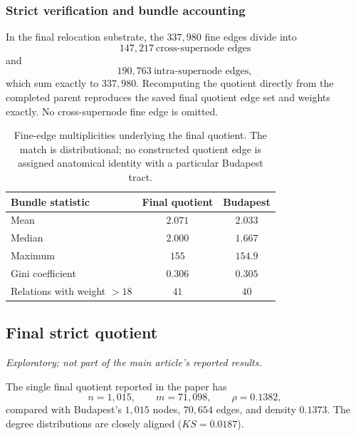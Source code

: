 \documentclass[12pt]{article}
\begin{document}
\subsubsection{Strict verification and bundle accounting}
In the final relocation substrate, the \(337{,}980\) fine edges divide into
\[
147{,}217\ \text{cross-supernode edges}
\]
and
\[
190{,}763\ \text{intra-supernode edges},
\]
which sum exactly to \(337{,}980\).  Recomputing the quotient directly from
the completed parent reproduces the saved final quotient edge set and weights
exactly.  No cross-supernode fine edge is omitted.

\begin{table}[H]
\centering
\small
\begin{tabular}{lcc}
\toprule
Bundle statistic & Final quotient & Budapest\\
\midrule
Mean & \(2.071\) & \(2.033\)\\
Median & \(2.000\) & \(1.667\)\\
Maximum & \(155\) & \(154.9\)\\
Gini coefficient & \(0.306\) & \(0.305\)\\
Relations with weight \(>18\) & \(41\) & \(40\)\\
\bottomrule
\end{tabular}
\caption{Fine-edge multiplicities underlying the final quotient.  The match is distributional; no constructed quotient edge is assigned anatomical identity with a particular Budapest tract.}
\label{tab:inverse-bundle-weights}
\end{table}

\subsection{Final strict quotient}
\label{supp:final-quotient}
\emph{Exploratory; not part of the main article's reported results.}

The single final quotient reported in the paper has
\[
n=1{,}015,\qquad m=71{,}098,\qquad \rho=0.1382,
\]
compared with Budapest's \(1{,}015\) nodes, \(70{,}654\) edges, and density
\(0.1373\).  The degree distributions are closely aligned
(\(KS=0.0187\)).
\end{document}
